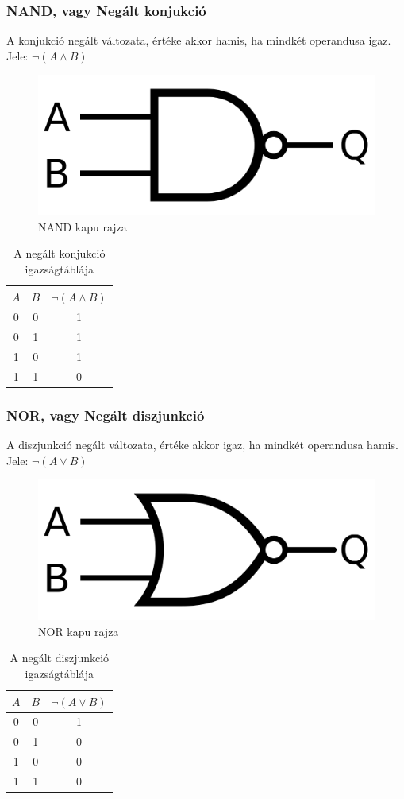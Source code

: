 \documentclass[
]{thesis-ekf}
\theoremstyle{definition}
\theoremstyle{remark}
\begin{document}
\subsubsection{NAND, vagy Negált konjukció}
A konjukció negált változata, értéke akkor hamis, ha mindkét operandusa igaz. Jele: $\neg(A \land B)$

\begin{figure}[H]
	\centering
	\includegraphics[width=0.3\linewidth]{nand}
	\caption{NAND kapu rajza}
	\label{fig:nand}
\end{figure}


\begin{table}[H]
	\centering
	\begin{tabular}{c|c|c}
		$A$ & $B$ & $\neg(A \land B)$\\               
		\hline
		0 & 0 & 1\\
		0 & 1 & 1\\
		1 & 0 & 1\\
		1 & 1 & 0
	\end{tabular}
	\caption{A negált konjukció igazságtáblája}
\end{table}

\subsubsection{NOR, vagy Negált diszjunkció}
A diszjunkció negált változata, értéke akkor igaz, ha mindkét operandusa hamis. Jele: $\neg(A \lor B)$

\begin{figure}[H]
	\centering
	\includegraphics[width=0.3\linewidth]{nor}
	\caption{NOR kapu rajza}
	\label{fig:nor}
\end{figure}


\begin{table}[H]
	\centering
	\begin{tabular}{c|c|c}
		$A$ & $B$ & $\neg(A \lor B)$\\               
		\hline
		0 & 0 & 1\\
		0 & 1 & 0\\
		1 & 0 & 0\\
		1 & 1 & 0
	\end{tabular}
	\caption{A negált diszjunkció igazságtáblája}
\end{table}
\end{document}
